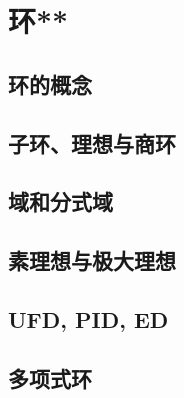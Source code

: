 \section{环**}
\subsection{环的概念}
\clearpage
\subsection{子环、理想与商环}
\clearpage
\subsection{域和分式域}
\clearpage
\subsection{素理想与极大理想}
\clearpage
\subsection{UFD, PID, ED}
\clearpage
\subsection{多项式环}
